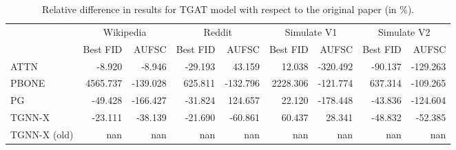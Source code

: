 \begin{table}
\centering
\begin{tabular}{lrrrrrrrr}
\toprule
 & \multicolumn{2}{c}{Wikipedia} & \multicolumn{2}{c}{Reddit} & \multicolumn{2}{c}{Simulate V1} & \multicolumn{2}{c}{Simulate V2} \\
 & Best FID & AUFSC & Best FID & AUFSC & Best FID & AUFSC & Best FID & AUFSC \\
\midrule
ATTN & -8.920 & -8.946 & -29.193 & 43.159 & 12.038 & -320.492 & -90.137 & -129.263 \\
PBONE & 4565.737 & -139.028 & 625.811 & -132.796 & 2228.306 & -121.774 & 637.314 & -109.265 \\
PG & -49.428 & -166.427 & -31.824 & 124.657 & 22.120 & -178.448 & -43.836 & -124.604 \\
TGNN-X & -23.111 & -38.139 & -21.690 & -60.861 & 60.437 & 28.341 & -48.832 & -52.385 \\
TGNN-X (old) & nan & nan & nan & nan & nan & nan & nan & nan \\
\bottomrule
\end{tabular}
\caption{\label{tab:tgat_results_diff}Relative difference in results for TGAT model with respect to the original paper (in \%).}
\end{table}
